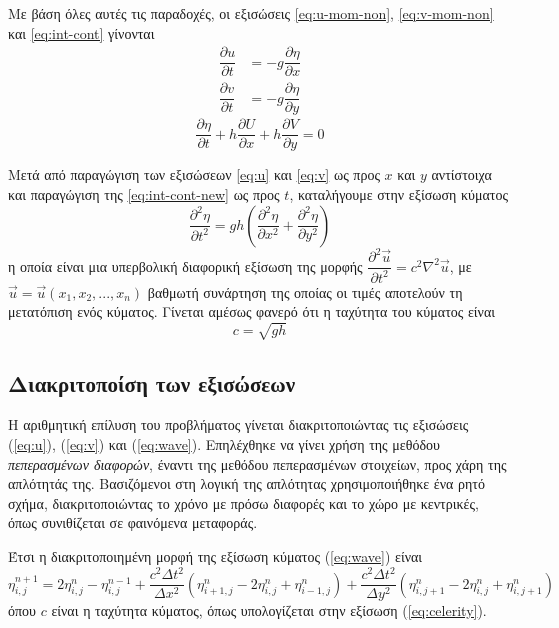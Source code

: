 Με βάση όλες αυτές τις παραδοχές, οι εξισώσεις \ref{eq:u-mom-non}, \ref{eq:v-mom-non} και \ref{eq:int-cont} γίνονται
\begin{align}
    \dfrac{\partial{u}}{\partial{t}} &= -g\dfrac{\partial{η}}{\partial{x}} \label{eq:u} \\
    \dfrac{\partial{v}}{\partial{t}} &= -g\dfrac{\partial{η}}{\partial{y}} \label{eq:v}
\end{align}
\begin{equation}
    \dfrac{\partial{η}}{\partial{t}} + h\dfrac{\partial{U}}{\partial{x}} + h\dfrac{\partial{V}}{\partial{y}} = 0 \label{eq:int-cont-new}
\end{equation}

Μετά από παραγώγιση των εξισώσεων \ref{eq:u} και \ref{eq:v} ως προς $x$ και $y$ αντίστοιχα και παραγώγιση της \ref{eq:int-cont-new} ως προς $t$, καταλήγουμε στην εξίσωση κύματος
\begin{equation}
    \dfrac{\partial^2{η}}{\partial{t}^2} = gh\left( \dfrac{\partial^2{η}}{\partial{x}^2} + \dfrac{\partial^2{η}}{\partial{y}^2} \right) \label{eq:wave}
\end{equation}
η οποία είναι μια υπερβολική διαφορική εξίσωση της μορφής $\dfrac{\partial^2{\vec{u}}}{\partial{t}^2}=c^2 \nabla^2 \vec{u}$, με $\vec{u} = \vec{u}(x_1, x_2, ... , x_n)$ βαθμωτή συνάρτηση της οποίας οι τιμές αποτελούν τη μετατόπιση ενός κύματος. Γίνεται αμέσως φανερό ότι η ταχύτητα του κύματος είναι 
\begin{equation}
    c=\sqrt{gh} \label{eq:celerity}
\end{equation}

\subsection{Διακριτοποίση των εξισώσεων}
Η αριθμητική επίλυση του προβλήματος γίνεται διακριτοποιώντας τις εξισώσεις (\ref{eq:u}), (\ref{eq:v}) και (\ref{eq:wave}). Επηλέχθηκε να γίνει χρήση της μεθόδου \textit{πεπερασμένων διαφορών}, έναντι της μεθόδου πεπερασμένων στοιχείων, προς χάρη της απλότητάς της. Βασιζόμενοι στη λογική της απλότητας χρησιμοποιήθηκε ένα ρητό σχήμα, διακριτοποιώντας το χρόνο με πρόσω διαφορές και το χώρο με κεντρικές, όπως συνιθίζεται σε φαινόμενα μεταφοράς.

Έτσι η διακριτοποιημένη μορφή της εξίσωση κύματος (\ref{eq:wave}) είναι
\begin{equation}
    η_{i,j}^{n+1} = 2 η_{i,j}^{n} - η_{i,j}^{n-1} + \dfrac{c^2 Δt^2}{Δx^2}\left( η_{i+1,j}^{n} - 2 η_{i,j}^{n} + η_{i-1,j}^{n}\right) + \dfrac{c^2 Δt^2}{Δy^2}\left( η_{i,j+1}^{n} - 2 η_{i,j}^{n} + η_{i,j+1}^{n}\right) \label{eq:dis:wave-1}
\end{equation}
όπου $c$ είναι η ταχύτητα κύματος, όπως υπολογίζεται στην εξίσωση (\ref{eq:celerity}).

